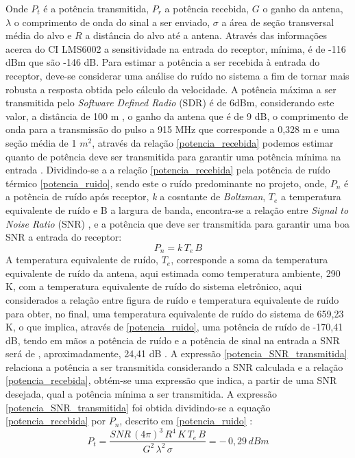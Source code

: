 Onde $P_t$ é a potência transmitida, $P_r$ a potência recebida, $G$ o ganho da antena, $\lambda$ o comprimento de onda do sinal a ser enviado, $\sigma$ a área de seção transversal média do alvo e $R$ a distância do alvo até a antena.
Através das informações acerca do CI LMS6002 a sensitividade na entrada do receptor, mínima, é de -116 dBm que são -146 dB. Para estimar a potência a ser recebida à entrada do receptor, deve-se considerar uma análise do ruído no sistema a fim de tornar mais robusta a resposta obtida pelo cálculo da velocidade.
A potência máxima a ser transmitida pelo  \emph{Software Defined Radio} (SDR) é de 6dBm, considerando este valor, a distância de 100 m , o ganho da antena que é de 9 dB, o comprimento de onda para a transmissão do pulso a 915 MHz que corresponde a 0,328 m e uma seção média de 1 $m^2$, através da relação \ref{potencia_recebida} podemos estimar quanto de potência deve ser transmitida para garantir uma potência mínima na entrada \cite{richards}.
Dividindo-se a a relação \ref{potencia_recebida} pela potência de ruído térmico \ref{potencia_ruido}, sendo este o ruído predominante no projeto, onde, $P_n$ é a potência de ruído após receptor, \emph{k} a cosntante de \emph{Boltzman}, $T_e$ a temperatura equivalente de ruído e B a largura de banda, encontra-se a relação entre \emph{Signal to Noise Ratio} (SNR) \cite{vasilescu}, e a potência que deve ser transmitida para garantir uma boa SNR a entrada do receptor:
\begin{equation}\label{potencia_ruido}
    P_n = k\, T_e\,B
\end{equation}
A temperatura equivalente de ruído, $T_e$, corresponde a soma da temperatura equivalente de ruído da antena, aqui estimada como temperatura ambiente, 290 K, com a temperatura equivalente de ruído do sistema eletrônico, aqui considerados a relação entre figura de ruído e temperatura equivalente de ruído para obter, no final, uma temperatura equivalente de ruído do sistema de 659,23 K, o que implica, através de \ref{potencia_ruido}, uma potência de ruído de -170,41 dB, tendo em mãos a potência de ruído e a potência de sinal na entrada a SNR será de , aproximadamente, 24,41 dB .
A expressão \ref{potencia_SNR_transmitida} relaciona a potência a ser transmitida considerando a SNR calculada e a relação \ref{potencia_recebida}, obtém-se uma expressão que indica, a partir de uma SNR desejada, qual a potência mínima a ser transmitida. A expressão \ref{potencia_SNR_transmitida} foi obtida dividindo-se a equação \ref{potencia_recebida} por $P_n$, descrito em \ref{potencia_ruido}  \cite{richards}:
\begin{equation}\label{potencia_SNR_transmitida}
    P_t = \frac{ SNR\,(4\pi)^{3}\,R^{4}\,K\,T_e\,B}{G^{2}\,   \lambda^{2}\, \sigma }  = -\,0,29\,dBm
\end{equation}
